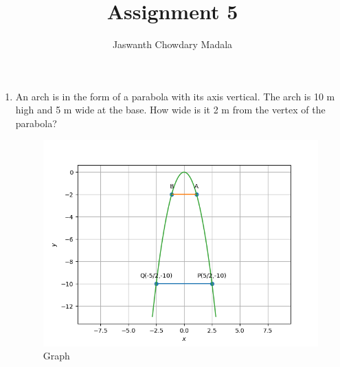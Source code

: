 \documentclass[journal,12pt,twocolumn]{IEEEtran}
\begin{document}
\vspace{3cm}


\title{Assignment 5}
\author{Jaswanth Chowdary Madala}


\maketitle

\newpage


\bigskip

\renewcommand{\thefigure}{\theenumi}
\renewcommand{\thetable}{\theenumi}

\begin{enumerate}
\item An arch is in the form of a parabola with its axis vertical. The arch is 10 m high and 5 m wide at the base. How wide is it 2 m from the vertex of the parabola?
\begin{figure}[ht]
\centering
\includegraphics[width = \columnwidth]{"figs/fig.png"}
\caption{Graph}
\label{fig:1}
\end{figure}


\end{enumerate}
\end{document}
